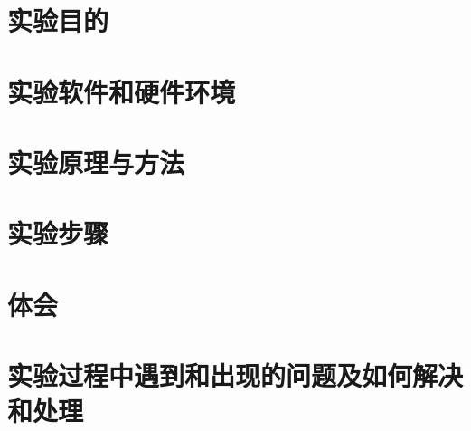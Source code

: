 \documentclass{../../../../Cls/SDU/ExpReport/IntroductiontoComputing/IntroductiontoComputing}
\begin{document}
\sduDate{\today}
\begin{sdu}
    \section{实验目的}
    \section{实验软件和硬件环境}
    \section{实验原理与方法}
    \section{实验步骤}
    \section{体会}
    \section{实验过程中遇到和出现的问题及如何解决和处理}
\end{sdu}
\end{document}
